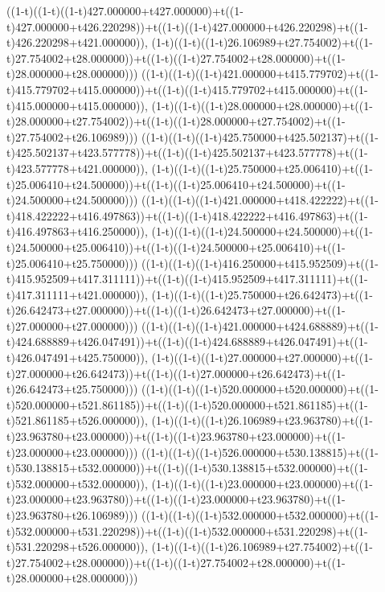 ((1-t)((1-t)((1-t)427.000000+t427.000000)+t((1-t)427.000000+t426.220298))+t((1-t)((1-t)427.000000+t426.220298)+t((1-t)426.220298+t421.000000)),                                     (1-t)((1-t)((1-t)26.106989+t27.754002)+t((1-t)27.754002+t28.000000))+t((1-t)((1-t)27.754002+t28.000000)+t((1-t)28.000000+t28.000000)))
((1-t)((1-t)((1-t)421.000000+t415.779702)+t((1-t)415.779702+t415.000000))+t((1-t)((1-t)415.779702+t415.000000)+t((1-t)415.000000+t415.000000)),                                     (1-t)((1-t)((1-t)28.000000+t28.000000)+t((1-t)28.000000+t27.754002))+t((1-t)((1-t)28.000000+t27.754002)+t((1-t)27.754002+t26.106989)))
((1-t)((1-t)((1-t)425.750000+t425.502137)+t((1-t)425.502137+t423.577778))+t((1-t)((1-t)425.502137+t423.577778)+t((1-t)423.577778+t421.000000)),                                     (1-t)((1-t)((1-t)25.750000+t25.006410)+t((1-t)25.006410+t24.500000))+t((1-t)((1-t)25.006410+t24.500000)+t((1-t)24.500000+t24.500000)))
((1-t)((1-t)((1-t)421.000000+t418.422222)+t((1-t)418.422222+t416.497863))+t((1-t)((1-t)418.422222+t416.497863)+t((1-t)416.497863+t416.250000)),                                     (1-t)((1-t)((1-t)24.500000+t24.500000)+t((1-t)24.500000+t25.006410))+t((1-t)((1-t)24.500000+t25.006410)+t((1-t)25.006410+t25.750000)))
((1-t)((1-t)((1-t)416.250000+t415.952509)+t((1-t)415.952509+t417.311111))+t((1-t)((1-t)415.952509+t417.311111)+t((1-t)417.311111+t421.000000)),                                     (1-t)((1-t)((1-t)25.750000+t26.642473)+t((1-t)26.642473+t27.000000))+t((1-t)((1-t)26.642473+t27.000000)+t((1-t)27.000000+t27.000000)))
((1-t)((1-t)((1-t)421.000000+t424.688889)+t((1-t)424.688889+t426.047491))+t((1-t)((1-t)424.688889+t426.047491)+t((1-t)426.047491+t425.750000)),                                     (1-t)((1-t)((1-t)27.000000+t27.000000)+t((1-t)27.000000+t26.642473))+t((1-t)((1-t)27.000000+t26.642473)+t((1-t)26.642473+t25.750000)))
((1-t)((1-t)((1-t)520.000000+t520.000000)+t((1-t)520.000000+t521.861185))+t((1-t)((1-t)520.000000+t521.861185)+t((1-t)521.861185+t526.000000)),                                     (1-t)((1-t)((1-t)26.106989+t23.963780)+t((1-t)23.963780+t23.000000))+t((1-t)((1-t)23.963780+t23.000000)+t((1-t)23.000000+t23.000000)))
((1-t)((1-t)((1-t)526.000000+t530.138815)+t((1-t)530.138815+t532.000000))+t((1-t)((1-t)530.138815+t532.000000)+t((1-t)532.000000+t532.000000)),                                     (1-t)((1-t)((1-t)23.000000+t23.000000)+t((1-t)23.000000+t23.963780))+t((1-t)((1-t)23.000000+t23.963780)+t((1-t)23.963780+t26.106989)))
((1-t)((1-t)((1-t)532.000000+t532.000000)+t((1-t)532.000000+t531.220298))+t((1-t)((1-t)532.000000+t531.220298)+t((1-t)531.220298+t526.000000)),                                     (1-t)((1-t)((1-t)26.106989+t27.754002)+t((1-t)27.754002+t28.000000))+t((1-t)((1-t)27.754002+t28.000000)+t((1-t)28.000000+t28.000000)))
